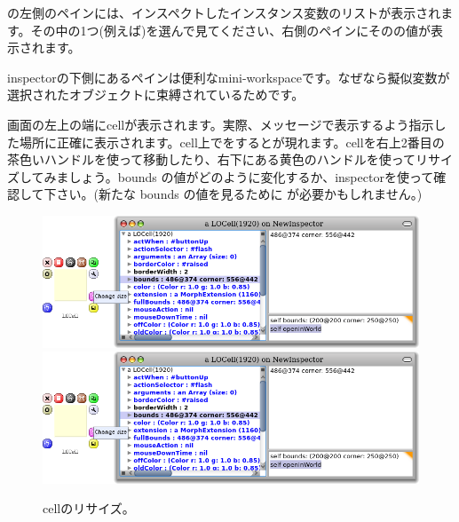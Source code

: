 \documentclass[a4paper,10pt,twoside]{book}
\begin{document}
の左側のペインには、インスペクトしたインスタンス変数のリストが表示されます。その中の1つ(例えば\mbox{)を選んで見てください}、右側のペインにそのの値が表示されます。


inspectorの下側にあるペインは便利なmini-workspaceです。なぜなら擬似変数\self が選択されたオブジェクトに束縛されているためです。

画面の左上の端にcellが表示されます。実際、メッセージで表示するよう指示した場所に正確に表示されます。cell上で\metaclick をするとが現れます。cellを右上2番目の茶色いハンドルを使って移動したり、右下にある黄色のハンドルを使ってリサイズしてみましょう。bounds の値がどのように変化するか、inspectorを使って確認して下さい。(新たな bounds の値を見るために  \actclick が必要かもしれません。)

\begin{figure}[htbp]
\centering
\ifluluelse
	{\includegraphics[width=\textwidth]{LOCellResize} }
	{\includegraphics[scale=0.7]{LOCellResize} }
\caption{cellのリサイズ。}
\end{figure}
\end{document}

